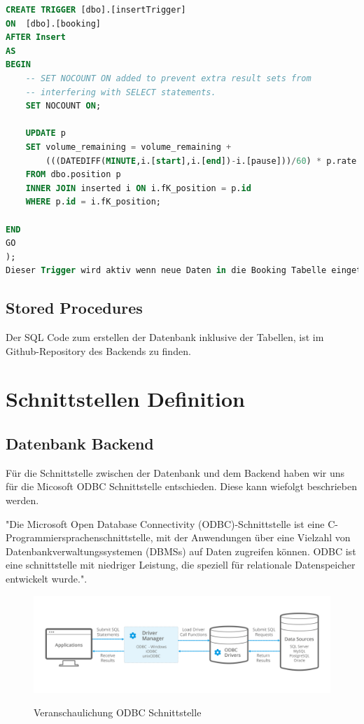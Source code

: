 \documentclass{article}
\begin{document}
\begin{lstlisting}[language=Sql, caption= Create Trigger Statement für Insert in Booking Table]
CREATE TRIGGER [dbo].[insertTrigger] 
ON  [dbo].[booking] 
AFTER Insert
AS 
BEGIN
	-- SET NOCOUNT ON added to prevent extra result sets from
	-- interfering with SELECT statements.
	SET NOCOUNT ON;

	UPDATE p
	SET volume_remaining = volume_remaining + 
        (((DATEDIFF(MINUTE,i.[start],i.[end])-i.[pause]))/60) * p.rate
	FROM dbo.position p
	INNER JOIN inserted i ON i.fK_position = p.id
	WHERE p.id = i.fK_position;

END
GO
);
Dieser Trigger wird aktiv wenn neue Daten in die Booking Tabelle eingetragen werden.


         \end{lstlisting}

\subsection{Stored Procedures}

Der SQL Code zum erstellen der Datenbank inklusive der Tabellen, ist im
Github-Repository des Backends zu finden.

\newpage

\section{Schnittstellen Definition}

\subsection{Datenbank Backend}
Für die Schnittstelle zwischen der Datenbank und dem Backend haben wir uns für
die Micosoft ODBC Schnittstelle entschieden. Diese kann wiefolgt beschrieben
werden.

"Die Microsoft Open Database Connectivity (ODBC)-Schnittstelle ist eine C-Programmiersprachenschnittstelle, mit der Anwendungen über eine Vielzahl von Datenbankverwaltungssystemen (DBMSs) auf Daten zugreifen können. ODBC ist eine schnittstelle mit niedriger Leistung, die speziell für relationale Datenspeicher entwickelt wurde."\cite{MSODBC}.

\begin{figure}[h]
    \centering
    \includegraphics[width= \textwidth]{images/odbc.png}
    \caption{Veranschaulichung ODBC Schnittstelle}
    \label{fig:beispiel}
    \cite{ODBC}
\end{figure}
\end{document}

